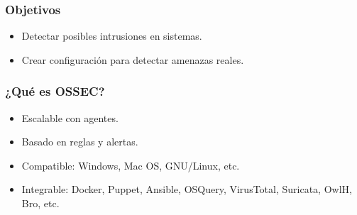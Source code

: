 \documentclass[a4paper,10pt]{beamer}
\begin{document}
\begin{frame}[fragile]
	\frametitle{Objetivos}

	\begin{itemize}
		\item Detectar posibles intrusiones en sistemas. %
		\item Crear configuración para detectar amenazas reales. %
	\end{itemize}
\end{frame}

\begin{frame}[fragile]
	\frametitle{¿Qué es OSSEC?}

	\begin{itemize}
		\item Escalable con agentes. %
		\item Basado en reglas y alertas. %
		\item Compatible: Windows, Mac OS, GNU/Linux, etc.
		\item Integrable: Docker, Puppet, Ansible, OSQuery, VirusTotal, Suricata, OwlH, Bro, etc.
	\end{itemize}
\end{frame}
\end{document}
